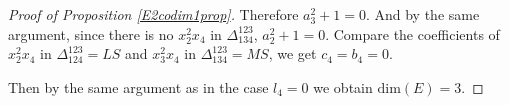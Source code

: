 \documentclass[10pt]{article} %
\theoremstyle{definition}
\begin{document}
\begin{proof}[Proof of Proposition \ref{E2codim1prop}]
Therefore $a_3^2+1=0$. And by the same argument, since there is no $x_2^2x_4$ in $\Delta^{123}_{134}$, $a_2^2+1=0$. Compare the coefficients of $x_2^2x_4$ in $\Delta^{123}_{124}=LS$ and $x_3^2x_4$ in $\Delta^{123}_{134}=MS$, we get $c_4=b_4=0$.

Then by the same argument as in the case $l_4=0$ we obtain $\mathrm{dim}(E)=3$.
\end{proof}



\end{document}
